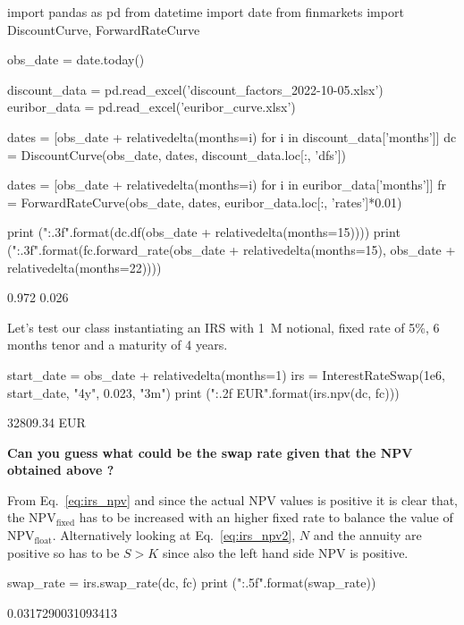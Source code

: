 \begin{ipython}
import pandas as pd
from datetime import date
from finmarkets import DiscountCurve, ForwardRateCurve

obs_date = date.today()

discount_data = pd.read_excel('discount_factors_2022-10-05.xlsx')
euribor_data = pd.read_excel('euribor_curve.xlsx')


dates = [obs_date + relativedelta(months=i) for i in discount_data['months']]
dc = DiscountCurve(obs_date, dates, discount_data.loc[:, 'dfs'])

dates = [obs_date + relativedelta(months=i) for i in euribor_data['months']]
fr = ForwardRateCurve(obs_date, dates, euribor_data.loc[:, 'rates']*0.01)

print ("{:.3f}".format(dc.df(obs_date + relativedelta(months=15))))
print ("{:.3f}".format(fc.forward_rate(obs_date + relativedelta(months=15), 
                                       obs_date + relativedelta(months=22))))
\end{ipython}
\begin{ioutput}
0.972
0.026
\end{ioutput}

Let's test our class instantiating an IRS with 1~M notional, fixed rate of 5\%, 6 months tenor and a maturity of 4 years.

\begin{ipython}
start_date = obs_date + relativedelta(months=1)
irs = InterestRateSwap(1e6, start_date, "4y", 0.023, "3m")
print ("{:.2f} EUR".format(irs.npv(dc, fc)))
\end{ipython}
\begin{ioutput}
32809.34 EUR
\end{ioutput}

\textbf{Can you guess what could be the \textbf{swap rate} given that the NPV obtained above ?}

From Eq.~\ref{eq:irs_npv} and since the actual NPV values is positive it is clear that, the NPV$_{\textrm{fixed}}$ has to be increased with an higher fixed rate to balance the value of NPV$_{\textrm{float}}$.
Alternatively looking at Eq.~\ref{eq:irs_npv2}, $N$ and the annuity are positive so has to be $S> K$ since also the left hand side NPV is positive.  

\begin{ipython}
swap_rate = irs.swap_rate(dc, fc)
print ("{:.5f}".format(swap_rate))
\end{ipython}
\begin{ioutput}
0.0317290031093413
\end{ioutput}
    
